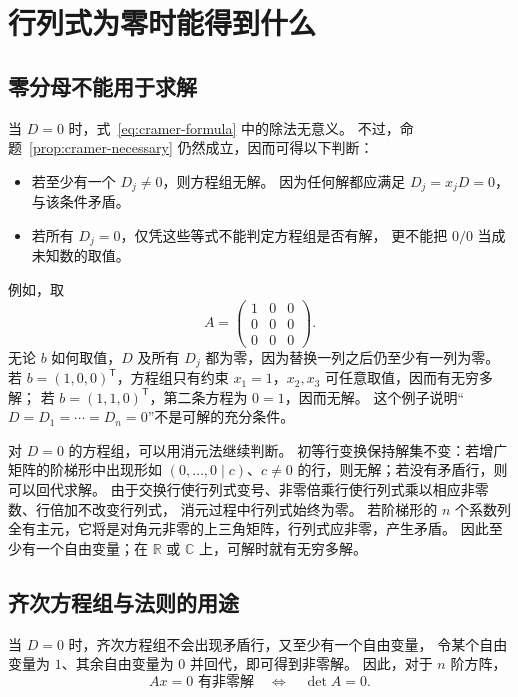 \documentclass[UTF8,12pt,a4paper,fontset=fandol]{ctexart}
\begin{document}
\section{行列式为零时能得到什么}

\subsection{零分母不能用于求解}

当 $D=0$ 时，式~\eqref{eq:cramer-formula} 中的除法无意义。
不过，命题~\ref{prop:cramer-necessary} 仍然成立，因而可得以下判断：
\begin{itemize}
  \item 若至少有一个 $D_j\ne0$，则方程组无解。
  因为任何解都应满足 $D_j=x_jD=0$，与该条件矛盾。
  \item 若所有 $D_j=0$，仅凭这些等式不能判定方程组是否有解，
  更不能把 $0/0$ 当成未知数的取值。
\end{itemize}

例如，取
\[
  A=\begin{pmatrix}1&0&0\\0&0&0\\0&0&0\end{pmatrix}.
\]
无论 $b$ 如何取值，$D$ 及所有 $D_j$ 都为零，因为替换一列之后仍至少有一列为零。
若 $b=(1,0,0)^{\mathsf T}$，方程组只有约束 $x_1=1$，$x_2,x_3$ 可任意取值，因而有无穷多解；
若 $b=(1,1,0)^{\mathsf T}$，第二条方程为 $0=1$，因而无解。
这个例子说明“$D=D_1=\cdots=D_n=0$”不是可解的充分条件。

对 $D=0$ 的方程组，可以用消元法继续判断。
初等行变换保持解集不变：若增广矩阵的阶梯形中出现形如
$(0,\ldots,0\mid c)$、$c\ne0$ 的行，则无解；若没有矛盾行，则可以回代求解。
由于交换行使行列式变号、非零倍乘行使行列式乘以相应非零数、行倍加不改变行列式，
消元过程中行列式始终为零。
若阶梯形的 $n$ 个系数列全有主元，它将是对角元非零的上三角矩阵，行列式应非零，产生矛盾。
因此至少有一个自由变量；在 $\mathbb R$ 或 $\mathbb C$ 上，可解时就有无穷多解。

\subsection{齐次方程组与法则的用途}

当 $D=0$ 时，齐次方程组不会出现矛盾行，又至少有一个自由变量，
令某个自由变量为 $1$、其余自由变量为 $0$ 并回代，即可得到非零解。
因此，对于 $n$ 阶方阵，
\[
  Ax=0\text{ 有非零解}\quad\Longleftrightarrow\quad\det A=0.
\]
\end{document}
